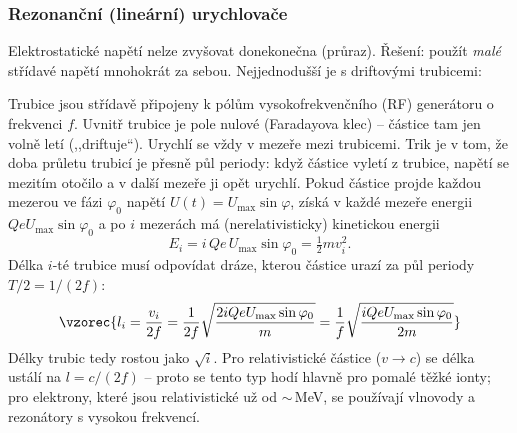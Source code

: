 \subsubsection{Rezonanční (lineární) urychlovače}

Elektrostatické napětí nelze zvyšovat donekonečna (průraz). Řešení: použít \emph{malé}
střídavé napětí mnohokrát za sebou. Nejjednodušší je  s driftovými
trubicemi:

\begin{center}
\end{center}

Trubice jsou střídavě připojeny k pólům vysokofrekvenčního (RF) generátoru o frekvenci
\(f\). Uvnitř trubice je pole nulové (Faradayova klec) -- částice tam jen volně letí
(,,driftuje``). Urychlí se vždy v mezeře mezi trubicemi. Trik je v tom, že doba průletu
trubicí je přesně půl periody: když částice vyletí z trubice, napětí se mezitím otočilo a
v další mezeře ji opět urychlí. Pokud částice projde každou mezerou ve fázi \(\varphi_0\)
napětí \(U(t)=U_{\max}\sin\varphi\), získá v každé mezeře energii \(QeU_{\max}\sin\varphi_0\) a
po \(i\) mezerách má (nerelativisticky) kinetickou energii
\[
  E_i = i\,Q e\,U_{\max}\sin\varphi_0 = \tfrac12 m v_i^2 .
\]
Délka \(i\)-té trubice musí odpovídat dráze, kterou částice urazí za půl periody
\(T/2 = 1/(2f)\):
\[
  \vzorec{l_i = \frac{v_i}{2f}
  = \frac{1}{2f}\sqrt{\frac{2iQeU_{\max}\sin\varphi_0}{m}}
  = \frac{1}{f}\sqrt{\frac{iQeU_{\max}\sin\varphi_0}{2m}}}
\]
Délky trubic tedy rostou jako \(\sqrt i\). Pro relativistické částice (\(v\to c\)) se délka
ustálí na \(l=c/(2f)\) -- proto se tento typ hodí hlavně pro pomalé těžké ionty; pro
elektrony, které jsou relativistické už od \(\sim\)\,MeV, se používají vlnovody a rezonátory
s vysokou frekvencí.

